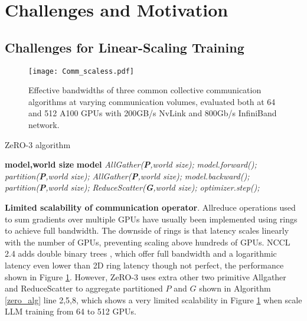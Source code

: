 \section{Challenges and Motivation}

\subsection{Challenges for Linear-Scaling Training}




\label{model_training}




\begin{figure}[t]
    \centering
    \texttt{[image: Comm\_scaless.pdf]}
    \caption{Effective bandwidths of three common collective communication algorithms at varying communication volumes, evaluated both at 64 and 512 A100 GPUs with 200GB/s NvLink and 800Gb/s InfiniBand network.}
    \label{Comm_scaless}
\end{figure}

\begin{algorithm}[t]
    \caption{ZeRO-3 algorithm}
    \small
    \label{zero_alg}
    \begin{algorithmic}[1]
        \Input \textbf{model,world size}
        \Output \textbf{model}
        \State \emph{AllGather(\textbf{P},world size);}
        \State \emph{model.forward();}
        \State \emph{partition(\textbf{P},world size);}
        \State \emph{AllGather(\textbf{P},world size);}
        \State \emph{model.backward();}
        \State \emph{partition(\textbf{P},world size);}
        \State \emph{ReduceScatter(\textbf{G},world size);}
        \State \emph{optimizer.step();}
        \EndWhile
    \end{algorithmic}
\end{algorithm}

\noindent\textbf{Limited scalability of communication operator}.
\label{highRatioOfCommToComp}
Allreduce operations used to sum gradients over multiple GPUs have usually been implemented using rings \cite{Horovod} to achieve full bandwidth. The downside of rings is that latency scales linearly with the number of GPUs, preventing scaling above hundreds of GPUs. NCCL 2.4 adds double binary trees \cite{TreeAllreduce3,Flattenedbutterfly}, which offer full bandwidth and a logarithmic latency even lower than 2D ring \cite{TreeAllreduce1,TreeAllreduce2} latency though not perfect, the performance shown in Figure \ref{Comm_scaless}. However, ZeRO-3 uses extra other two primitive Allgather \cite{allgather1} and ReduceScatter \cite{ReduceScatter} to aggregate partitioned $P$ and $G$ shown in Algorithm \ref{zero_alg} line 2,5,8, which shows a very limited scalability in Figure \ref{Comm_scaless} when scale LLM training from 64 to 512 GPUs.


